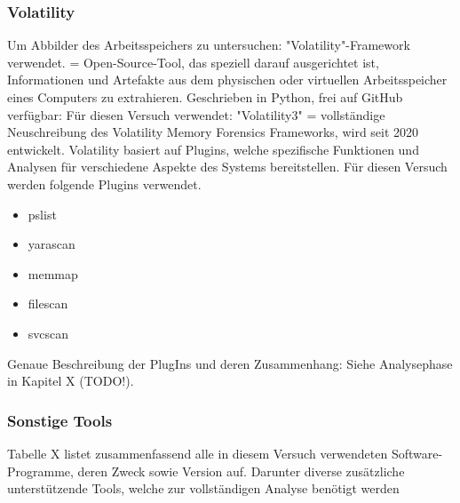 \subsubsection*{Volatility}
\label{subsubsection:methodik-vorbereitung-verwendetesoftware-volatility}
Um Abbilder des Arbeitsspeichers zu untersuchen: "Volatility"-Framework verwendet.
= Open-Source-Tool, das speziell darauf ausgerichtet ist, Informationen und Artefakte aus dem physischen oder virtuellen Arbeitsspeicher eines Computers zu extrahieren.
Geschrieben in Python, frei auf GitHub verfügbar:	
Für diesen Versuch verwendet: "Volatility3"
= vollständige Neuschreibung des Volatility Memory Forensics Frameworks, wird seit 2020 entwickelt.
Volatility basiert auf Plugins, welche spezifische Funktionen und Analysen für verschiedene Aspekte des Systems bereitstellen. Für diesen Versuch werden folgende Plugins verwendet. 
\begin{itemize}
\item pslist	
\item yarascan		
\item memmap	 	
\item filescan
\item svcscan
\end{itemize}
Genaue Beschreibung der PlugIns und deren Zusammenhang: Siehe Analysephase in Kapitel X (TODO!).

\subsubsection*{Sonstige Tools}
\label{subsubsection:methodik-vorbereitung-verwendetesoftware-sonstigetools}
Tabelle X listet zusammenfassend alle in diesem Versuch verwendeten Software-Programme, deren Zweck sowie Version auf.
Darunter diverse zusätzliche unterstützende Tools, welche zur vollständigen Analyse benötigt werden

